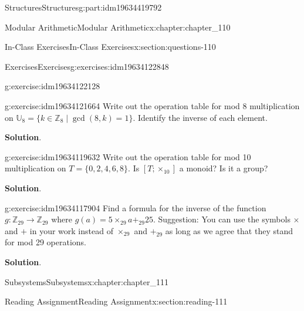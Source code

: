 \documentclass[oneside,10pt,]{book}
\newcommand{\blocktitlefont}{\relax}
\numberwithin{equation}{section}
\begin{document}
\begin{partptx}{Structures}{}{Structures}{}{}{g:part:idm19634419792}
\begin{chapterptx}{Modular Arithmetic}{}{Modular Arithmetic}{}{}{x:chapter:chapter_110}
\begin{sectionptx}{In-Class Exercises}{}{In-Class Exercises}{}{}{x:section:questions-110}
\begin{exercises-subsection-numberless}{Exercises}{}{Exercises}{}{}{g:exercises:idm19634122848}
\begin{exercisegroup}
\begin{divisionexerciseeg}{1}{}{}{g:exercise:idm19634122128}
\end{divisionexerciseeg}%
\begin{divisionexerciseeg}{2}{}{}{g:exercise:idm19634121664}%
Write out the operation table for mod 8 multiplication on \(\mathbb{U}_8= \{k \in \mathbb{Z}_8 \mid \gcd{(8,k)}=1\}\).  Identify the inverse of each element.%
\par\smallskip%
\noindent\textbf{\blocktitlefont Solution}.\hypertarget{g:solution:idm19634120928}{}\quad{}%
\end{divisionexerciseeg}%
\begin{divisionexerciseeg}{3}{}{}{g:exercise:idm19634119632}%
Write out the operation table for mod 10 multiplication on \(T=\{0,2,4,6,8\}\). Is \([T;\times_{10}]\)	 a monoid? Is it a group?%
\par\smallskip%
\noindent\textbf{\blocktitlefont Solution}.\hypertarget{g:solution:idm19634119504}{}\quad{}%
\end{divisionexerciseeg}%
\begin{divisionexerciseeg}{4}{}{}{g:exercise:idm19634117904}%
Find a formula for the inverse of the function \(g: \mathbb{Z}_{29} \rightarrow  \mathbb{Z}_{29}\) where \(g(a)= 5\times_{29}a +_{29}25\).  Suggestion:  You can use the symbols \(\times\) and \(+\) in your work instead of \(\times_{29}\) and \(+_{29}\) as long as we agree that they stand for mod 29 operations.%
\par\smallskip%
\noindent\textbf{\blocktitlefont Solution}.\hypertarget{g:solution:idm19634117776}{}\quad{}%
\end{divisionexerciseeg}%
\end{exercisegroup}
\par\medskip\noindent
\end{exercises-subsection-numberless}
\end{sectionptx}
\end{chapterptx}
%
\typeout{************************************************}
\typeout{************************************************}
%
\begin{chapterptx}{Subsystems}{}{Subsystems}{}{}{x:chapter:chapter_111}
%
%
%
%
%
\typeout{************************************************}
\typeout{************************************************}
%
\begin{sectionptx}{Reading Assignment}{}{Reading Assignment}{}{}{x:section:reading-111}

\end{sectionptx}
\end{chapterptx}
\end{partptx}
\end{document}
